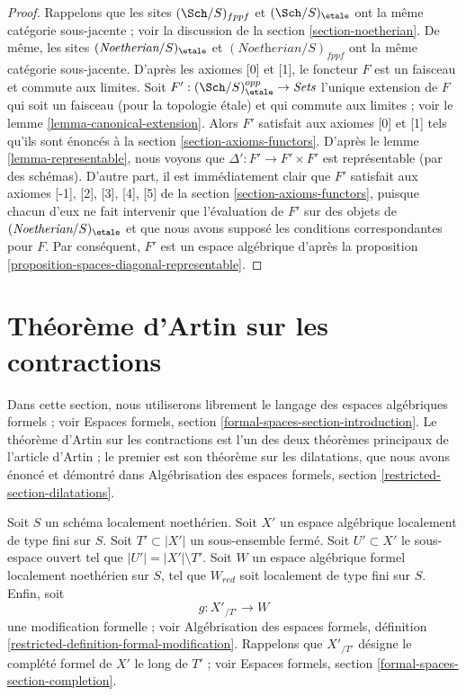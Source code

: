 \begin{proof}
Rappelons que les sites $(\Sch/S)_{fppf}$ et $(\Sch/S)_\etale$ ont la même
catégorie sous-jacente ; voir la discussion de la section
\ref{section-noetherian}. De même, les sites
$(\textit{Noetherian}/S)_\etale$ et
$(\textit{Noetherian}/S)_{fppf}$ ont la même catégorie sous-jacente. D'après
les axiomes [0] et [1], le foncteur $F$ est un faisceau et commute aux limites.
Soit $F' : (\Sch/S)_\etale^{opp} \to \textit{Sets}$ l'unique extension de $F$
qui soit un faisceau (pour la topologie étale) et qui commute aux limites ;
voir le lemme \ref{lemma-canonical-extension}. Alors $F'$ satisfait aux axiomes
[0] et [1] tels qu'ils sont énoncés à la section
\ref{section-axioms-functors}. D'après le lemme \ref{lemma-representable}, nous
voyons que $\Delta' : F' \to F' \times F'$ est représentable (par des schémas).
D'autre part, il est immédiatement clair que $F'$ satisfait aux axiomes [-1],
[2], [3], [4], [5] de la section \ref{section-axioms-functors}, puisque chacun
d'eux ne fait intervenir que l'évaluation de $F'$ sur des objets de
$(\textit{Noetherian}/S)_\etale$ et que nous avons supposé les conditions
correspondantes pour $F$. Par conséquent, $F'$ est un espace algébrique
d'après la proposition \ref{proposition-spaces-diagonal-representable}.
\end{proof}












\section{Théorème d'Artin sur les contractions}
\label{section-contractions}

\noindent
Dans cette section, nous utiliserons librement le langage des espaces
algébriques formels ; voir Espaces formels, section
\ref{formal-spaces-section-introduction}. Le théorème d'Artin sur les
contractions est l'un des deux théorèmes principaux de l'article d'Artin
\cite{ArtinII} ; le premier est son théorème sur les dilatations, que nous avons
énoncé et démontré dans Algébrisation des espaces formels, section
\ref{restricted-section-dilatations}.

\begin{situation}
\label{situation-contractions}
Soit $S$ un schéma localement noethérien. Soit $X'$ un espace algébrique
localement de type fini sur $S$. Soit $T' \subset |X'|$ un sous-ensemble fermé.
Soit $U' \subset X'$ le sous-espace ouvert tel que
$|U'| = |X'| \setminus T'$. Soit $W$ un espace algébrique formel localement
noethérien sur $S$, tel que $W_{red}$ soit localement de type fini sur $S$.
Enfin, soit
$$
g : X'_{/T'} \longrightarrow W
$$
une modification formelle ; voir Algébrisation des espaces formels, définition
\ref{restricted-definition-formal-modification}. Rappelons que $X'_{/T'}$
désigne le complété formel de $X'$ le long de $T'$ ; voir Espaces formels,
section \ref{formal-spaces-section-completion}.
\end{situation}

